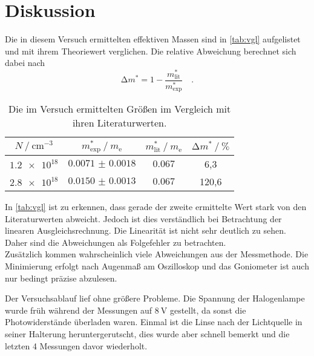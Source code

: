 \newpage
\section{Diskussion}

\noindent Die in diesem Versuch ermittelten effektiven Massen sind in \autoref{tab:vgl} aufgelistet und mit ihrem Theoriewert verglichen. 
Die relative Abweichung berechnet sich dabei nach
\begin{equation*}
    \increment m^* = 1 - \frac{m^*_\text{lit}}{m^*_\text{exp}} \quad .
\end{equation*}

\begin{table}
    \centering
    \caption{Die im Versuch ermittelten Größen im Vergleich mit ihren Literaturwerten.}
    \label{tab:vgl}
    \begin{tabular}{c c c c}
        \toprule
        {$N \mathbin{/} \si{\centi\metre\tothe{-3}}$} & {$m^*_\text{exp} \mathbin{/} m_\text{e}$} & {$m^*_\text{lit} \mathbin{/} m_\text{e}$ \protect \cite{effmasse}} & {$\increment m^* \mathbin{/} \si{\percent}$}\\ 
        \midrule
        $\num{1.2e18}$ & $\num{0.0071(18)}$ & $\num{0.067}$ & 6,3 \\
        $\num{2.8e18}$ & $\num{0.0150(13)}$ & $\num{0.067}$ & 120,6 \\
        \bottomrule
    \end{tabular}
\end{table}

\noindent In \autoref{tab:vgl} ist zu erkennen, dass gerade der zweite ermittelte Wert stark von den Literaturwerten abweicht. Jedoch ist dies verständlich bei 
Betrachtung der linearen Ausgleichsrechnung. Die Linearität ist nicht sehr deutlich zu sehen. Daher sind die Abweichungen als Folgefehler zu betrachten. \\
Zusätzlich kommen wahrscheinlich viele Abweichungen aus der Messmethode. Die Minimierung erfolgt nach Augenmaß am Oszilloskop und das Goniometer ist auch nur 
bedingt präzise abzulesen.

\noindent Der Versuchsablauf lief ohne größere Probleme. Die Spannung der Halogenlampe wurde früh während der Messungen auf $\SI{8}{\volt}$ gestellt, da sonst die 
Photowiderstände überladen waren. Einmal ist die Linse nach der Lichtquelle in seiner Halterung heruntergerutscht, dies wurde aber schnell bemerkt und die 
letzten 4 Messungen davor wiederholt.
